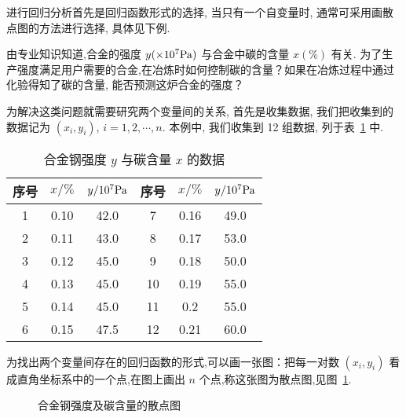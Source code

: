 进行回归分析首先是回归函数形式的选择, 当只有一个自变量时, 通常可采用画散点图的方法进行选择, 具体见下例.

\begin{example}\label{exam:8.4.1}
    由专业知识知道,合金的强度 $y(\times 10^{7}\Pa)$ 与合金中碳的含量 $x (\%)$ 有关. 为了生产强度满足用户需要的合金,在冶炼时如何控制碳的含量？如果在冶炼过程中通过化验得知了碳的含量, 能否预测这炉合金的强度？

    为解决这类问题就需要研究两个变量间的关系, 首先是收集数据, 我们把收集到的数据记为 $(x_{i}, y_{i})$, $i = 1, 2, \cdots, n$. 本例中, 我们收集到 12 组数据, 列于表~\ref{tab:8.4.1} 中.

    \begin{table}[htbp]
        \centering
        \caption{合金钢强度 $y$ 与碳含量 $x$ 的数据}
        \begin{tabular}{ccc|ccc}
        \toprule
        序号    &  $x /\%$  &  $y/10^{7}\Pa$  & 序号    &  $x/\%$   & $y/10^{7}\Pa$  \\
        \midrule
         1 & 0.10 & 42.0 &  7 & 0.16 & 49.0 \\
         2 & 0.11 & 43.0 &  8 & 0.17 & 53.0 \\
         3 & 0.12 & 45.0 &  9 & 0.18 & 50.0 \\
         4 & 0.13 & 45.0 & 10 & 0.19 & 55.0 \\
         5 & 0.14 & 45.0 & 11 & 0.2  & 55.0 \\
         6 & 0.15 & 47.5 & 12 & 0.21 & 60.0 \\
         \bottomrule
        \end{tabular}%
        \label{tab:8.4.1}%
    \end{table}%

    为找出两个变量间存在的回归函数的形式,可以画一张图：把每一对数 $(x_{i}, y_{i})$ 看成直角坐标系中的一个点,在图上画出 $n$ 个点,称这张图为散点图,见图~\ref{fig:8.4.1}.
    \begin{figure}[htbp]
        \centering
        \caption{合金钢强度及碳含量的散点图}
        \label{fig:8.4.1}
    \end{figure}


\end{example}
